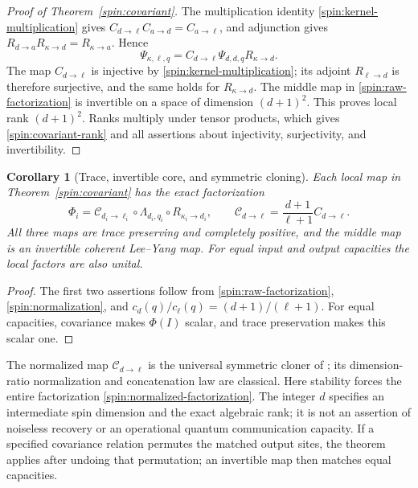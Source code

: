 \documentclass[reqno]{amsart}
\newtheorem{corollary}[theorem]{Corollary}
\theoremstyle{definition}
\theoremstyle{remark}
\begin{document}
\begin{proof}[Proof of Theorem~\ref{spin:covariant}]
The multiplication identity \eqref{spin:kernel-multiplication} gives
$C_{d\to\ell}C_{a\to d}=C_{a\to\ell}$, and adjunction gives
$R_{d\to a}R_{\kappa\to d}=R_{\kappa\to a}$.  Hence
\begin{equation}\label{spin:raw-factorization}
 \Psi_{\kappa,\ell,q}
 =C_{d\to\ell}\Psi_{d,d,q}R_{\kappa\to d}.
\end{equation}
The map $C_{d\to\ell}$ is injective by
\eqref{spin:kernel-multiplication}; its adjoint $R_{\ell\to d}$ is
therefore surjective, and the same holds for $R_{\kappa\to d}$.
The middle map in \eqref{spin:raw-factorization} is invertible on a
space of dimension $(d+1)^2$.  This proves local rank $(d+1)^2$.
Ranks multiply under tensor products, which gives
\eqref{spin:covariant-rank} and all assertions about injectivity,
surjectivity, and invertibility.
\end{proof}

\begin{corollary}[Trace, invertible core, and symmetric cloning]
\label{spin:trace-core-cloner}
Each local map in Theorem~\ref{spin:covariant} has the exact factorization
\begin{equation}\label{spin:normalized-factorization}
 \Phi_i=\mathcal C_{d_i\to\ell_i}\circ\Lambda_{d_i,q_i}
                                      \circ R_{\kappa_i\to d_i},
 \qquad
 \mathcal C_{d\to\ell}=\frac{d+1}{\ell+1}C_{d\to\ell}.
\end{equation}
All three maps are trace preserving and completely positive, and the
middle map is an invertible coherent Lee--Yang map.
For equal input and output capacities the local factors are also unital.
\end{corollary}

\begin{proof}
The first two assertions follow from \eqref{spin:raw-factorization},
\eqref{spin:normalization}, and
$c_d(q)/c_\ell(q)=(d+1)/(\ell+1)$.  For equal capacities,
covariance makes $\Phi(I)$ scalar, and trace preservation makes this
scalar one.
\end{proof}

The normalized map $\mathcal C_{d\to\ell}$ is the universal symmetric
cloner of \cite[Eq.~(3.3)]{Werner98}; its dimension-ratio normalization
and concatenation law are classical.  Here stability forces the entire
factorization \eqref{spin:normalized-factorization}.  The integer $d$
specifies an intermediate spin dimension and the exact algebraic rank;
it is not an assertion of noiseless recovery or an operational quantum
communication capacity.  If a specified covariance relation permutes the
matched output sites, the theorem applies after undoing that permutation;
an invertible map then matches equal capacities.
\end{document}
